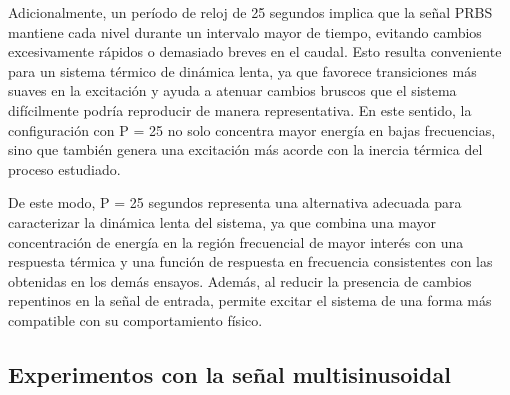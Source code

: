 \documentclass[11pt]{report}
\begin{document}
Adicionalmente, un período de reloj de 25 segundos implica que la señal PRBS mantiene cada nivel durante un intervalo mayor de tiempo, evitando cambios excesivamente rápidos o demasiado breves en el caudal. Esto resulta conveniente para un sistema térmico de dinámica lenta, ya que favorece transiciones más suaves en la excitación y ayuda a atenuar cambios bruscos que el sistema difícilmente podría reproducir de manera representativa. En este sentido, la configuración con P = 25 no solo concentra mayor energía en bajas frecuencias, sino que también genera una excitación más acorde con la inercia térmica del proceso estudiado.

De este modo, P = 25 segundos representa una alternativa adecuada para caracterizar la dinámica lenta del sistema, ya que combina una mayor concentración de energía en la región frecuencial de mayor interés con una respuesta térmica y una función de respuesta en frecuencia consistentes con las obtenidas en los demás ensayos. Además, al reducir la presencia de cambios repentinos en la señal de entrada, permite excitar el sistema de una forma más compatible con su comportamiento físico.





\subsection{Experimentos con la señal multisinusoidal}
\end{document}
